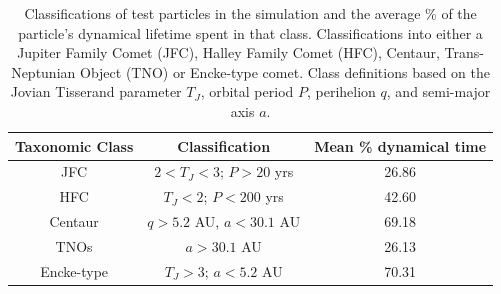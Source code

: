 \begin{table}[t!]
\centering
\caption[Particle classes and their mean dynamical lifetimes]{Classifications of test particles in the simulation and the average \% of the particle's dynamical lifetime spent in that class. Classifications into either a Jupiter Family Comet (JFC), Halley Family Comet (HFC), Centaur, Trans-Neptunian Object (TNO) or Encke-type comet. Class definitions based on the Jovian Tisserand parameter $T_J$, orbital period $P$, perihelion $q$, and semi-major axis $a$.}\vspace{1.5ex}
\label{table:class}
\begin{tabular}{ccc} \toprule \toprule
Taxonomic Class & Classification                                      & Mean \% dynamical time \\ \midrule
JFC             & $2 < T_J < 3$; $P > 20$ yrs & 26.86                  \\
HFC             & $T_J < 2$; $P < 200$ yrs               & 42.60                  \\
Centaur         & $q > 5.2$ AU, $a < 30.1$ AU          & 69.18                  \\
TNOs            & $a > 30.1$ AU                              & 26.13                  \\
Encke-type          & $T_J > 3$; $a < 5.2$ AU             & 70.31                 
\end{tabular}
\vspace{-3ex}
\end{table}







